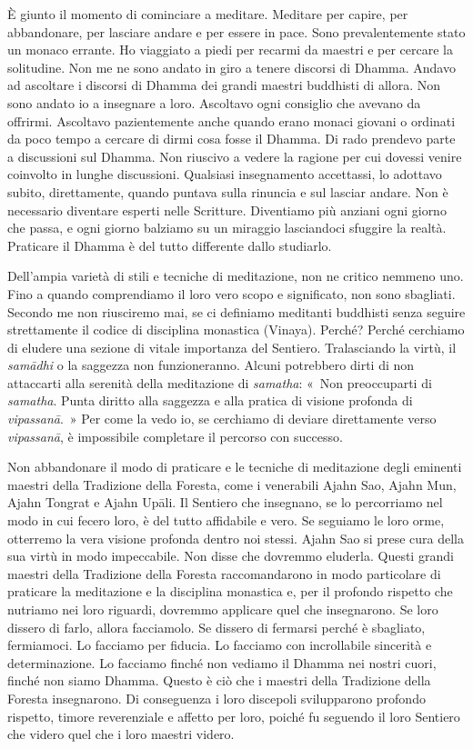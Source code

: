 È giunto il momento di cominciare a meditare. Meditare per capire, per
abbandonare, per lasciare andare e per essere in pace. Sono
prevalentemente stato un monaco errante. Ho viaggiato a piedi per
recarmi da maestri e per cercare la solitudine. Non me ne sono andato in
giro a tenere discorsi di Dhamma. Andavo ad ascoltare i discorsi di
Dhamma dei grandi maestri buddhisti di allora. Non sono andato io a
insegnare a loro. Ascoltavo ogni consiglio che avevano da offrirmi.
Ascoltavo pazientemente anche quando erano monaci giovani o ordinati da
poco tempo a cercare di dirmi cosa fosse il Dhamma. Di rado prendevo
parte a discussioni sul Dhamma. Non riuscivo a vedere la ragione per cui
dovessi venire coinvolto in lunghe discussioni. Qualsiasi insegnamento
accettassi, lo adottavo subito, direttamente, quando puntava sulla
rinuncia e sul lasciar andare. Non è necessario diventare esperti nelle
Scritture. Diventiamo più anziani ogni giorno che passa, e ogni giorno
balziamo su un miraggio lasciandoci sfuggire la realtà. Praticare il
Dhamma è del tutto differente dallo studiarlo.

Dell'ampia varietà di stili e tecniche di meditazione, non ne critico
nemmeno uno. Fino a quando comprendiamo il loro vero scopo e
significato, non sono sbagliati. Secondo me non riusciremo mai, se ci
definiamo meditanti buddhisti senza seguire strettamente il codice di
disciplina monastica (Vinaya). Perché? Perché cerchiamo di eludere una
sezione di vitale importanza del Sentiero. Tralasciando la virtù, il
\emph{samādhi} o la saggezza non funzioneranno. Alcuni potrebbero dirti
di non attaccarti alla serenità della meditazione di \emph{samatha}:
«~Non preoccuparti di \emph{samatha}. Punta diritto alla saggezza e alla
pratica di visione profonda di \emph{vipassanā}.~» Per come la vedo io,
se cerchiamo di deviare direttamente verso \emph{vipassanā}, è
impossibile completare il percorso con successo.

Non abbandonare il modo di praticare e le tecniche di meditazione degli
eminenti maestri della Tradizione della Foresta, come i venerabili Ajahn
Sao, Ajahn Mun, Ajahn Tongrat e Ajahn Upāli. Il Sentiero che insegnano,
se lo percorriamo nel modo in cui fecero loro, è del tutto affidabile e
vero. Se seguiamo le loro orme, otterremo la vera visione profonda
dentro noi stessi. Ajahn Sao si prese cura della sua virtù in modo
impeccabile. Non disse che dovremmo eluderla. Questi grandi maestri
della Tradizione della Foresta raccomandarono in modo particolare di
praticare la meditazione e la disciplina monastica e, per il profondo
rispetto che nutriamo nei loro riguardi, dovremmo applicare quel che
insegnarono. Se loro dissero di farlo, allora facciamolo. Se dissero di
fermarsi perché è sbagliato, fermiamoci. Lo facciamo per fiducia. Lo
facciamo con incrollabile sincerità e determinazione. Lo facciamo finché
non vediamo il Dhamma nei nostri cuori, finché non siamo Dhamma. Questo
è ciò che i maestri della Tradizione della Foresta insegnarono. Di
conseguenza i loro discepoli svilupparono profondo rispetto, timore
reverenziale e affetto per loro, poiché fu seguendo il loro Sentiero che
videro quel che i loro maestri videro.

